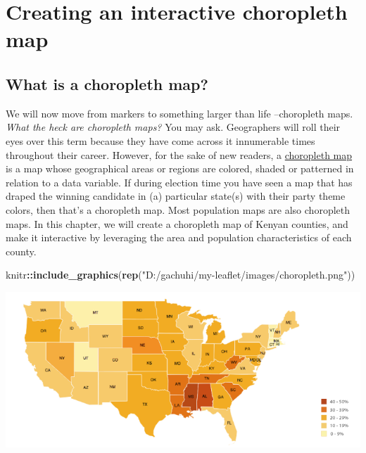 \documentclass[
]{book}
\newenvironment{Shaded}{\begin{snugshade}}{\end{snugshade}}
\newcommand{\FunctionTok}[1]{\textcolor[rgb]{0.13,0.29,0.53}{\textbf{#1}}}
\newcommand{\NormalTok}[1]{#1}
\newcommand{\SpecialCharTok}[1]{\textcolor[rgb]{0.81,0.36,0.00}{\textbf{#1}}}
\newcommand{\StringTok}[1]{\textcolor[rgb]{0.31,0.60,0.02}{#1}}
\begin{document}
\hypertarget{creating-an-interactive-choropleth-map}{%
\chapter{Creating an interactive choropleth map}\label{creating-an-interactive-choropleth-map}}

\hypertarget{what-is-a-choropleth-map}{%
\section{What is a choropleth map?}\label{what-is-a-choropleth-map}}

We will now move from markers to something larger than life --choropleth maps. \emph{What the heck are choropleth maps?} You may ask. Geographers will roll their eyes over this term because they have come across it innumerable times throughout their career. However, for the sake of new readers, a \href{https://datavizcatalogue.com/methods/choropleth.html}{choropleth map} is a map whose geographical areas or regions are colored, shaded or patterned in relation to a data variable. If during election time you have seen a map that has draped the winning candidate in (a) particular state(s) with their party theme colors, then that's a choropleth map. Most population maps are also choropleth maps. In this chapter, we will create a choropleth map of Kenyan counties, and make it interactive by leveraging the area and population characteristics of each county.

\begin{Shaded}
\begin{Highlighting}[]
\NormalTok{knitr}\SpecialCharTok{::}\FunctionTok{include\_graphics}\NormalTok{(}\FunctionTok{rep}\NormalTok{(}\StringTok{"D:/gachuhi/my{-}leaflet/images/choropleth.png"}\NormalTok{))}
\end{Highlighting}
\end{Shaded}

\includegraphics[width=10.14in]{../images/choropleth}
\end{document}

